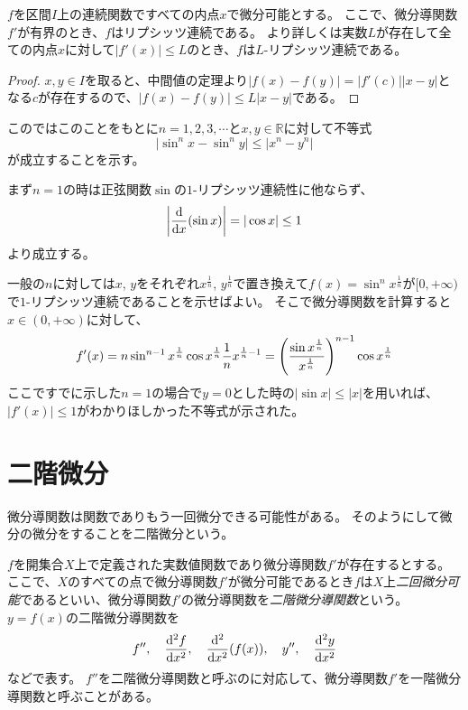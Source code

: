 \begin{proposition}
$f$を区間$I$上の連続関数ですべての内点$x$で微分可能とする。
ここで、微分導関数$f'$が有界のとき、$f$はリプシッツ連続である。
より詳しくは実数$L$が存在して全ての内点$x$に対して$|f'(x)| \le L$のとき、$f$は$L$-リプシッツ連続である。
\end{proposition}

\begin{proof}
$x, y \in I$を取ると、中間値の定理より$|f(x)-f(y)| = |f'(c)||x-y|$となる$c$が存在するので、$|f(x)-f(y)| \le L|x-y|$である。
\end{proof}

\begin{example}
このではこのことをもとに$n = 1, 2, 3, \cdots$と$x, y \in \mathbb{R}$に対して不等式
$$
|\sin^n x-\sin^n y| \le |x^n-y^n|
$$
が成立することを示す。

まず$n = 1$の時は正弦関数$\sin$の$1$-リプシッツ連続性に他ならず、
$$
\abs{\dv{x}(\sin x)} = |\cos x| \le 1
$$
より成立する。

一般の$n$に対しては$x$, $y$をそれぞれ$x^{\frac{1}{n}}$, $y^{\frac{1}{n}}$で置き換えて$f(x) = \sin^n x^{\frac{1}{n}}$が$[0, +\infty)$で$1$-リプシッツ連続であることを示せばよい。
そこで微分導関数を計算すると$x \in (0, +\infty)$に対して、
$$
f'(x) = n\sin^{n-1}x^{\frac{1}{n}}\cos x^{\frac{1}{n}}\frac{1}{n}x^{\frac{1}{n}-1} = \qty(\frac{\sin x^{\frac{1}{n}}}{x^{\frac{1}{n}}})^{n-1}\cos x^{\frac{1}{n}}
$$
ここですでに示した$n = 1$の場合で$y = 0$とした時の$|\sin x| \le |x|$を用いれば、$|f'(x)| \le 1$がわかりほしかった不等式が示された。
\end{example}

\section{二階微分}

微分導関数は関数でありもう一回微分できる可能性がある。
そのようにして微分の微分をすることを二階微分という。

\begin{definition}[二階微分]
$f$を開集合$X$上で定義された実数値関数であり微分導関数$f'$が存在するとする。
ここで、$X$のすべての点で微分導関数$f'$が微分可能であるとき$f$は$X$上\emph{二回微分可能}であるといい、微分導関数$f'$の微分導関数を\emph{二階微分導関数}という。
$y = f(x)$の二階微分導関数を
$$
f'', \quad \dv[2]{f}{x}, \quad \dv[2]{x}(f(x)), \quad y'', \quad \dv[2]{y}{x}
$$
などで表す。
$f''$を二階微分導関数と呼ぶのに対応して、微分導関数$f'$を一階微分導関数と呼ぶことがある。
\end{definition}

